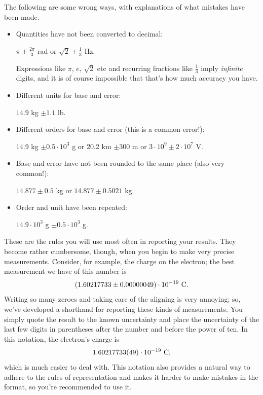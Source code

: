 The following are some wrong ways, with explanations of what mistakes have been made.
\begin{itemize}

\item Quantities have not been converted to decimal:
\begin{center}
$\pi \pm \frac{2\pi}{3}$ rad or $\sqrt{2} \pm \frac{1}{3}$ Hz.
\end{center}
Expressions like $\pi$, $e$, $\sqrt{2}$ etc and recurring fractions like $\frac{1}{3}$ imply {\it infinite} digits, and it is of course impossible that that's how much accuracy you have.

\item Different units for base and error:
\begin{center}
$14.9$ kg $\pm 1.1$ lb.
\end{center}

\item Different orders for base and error (this is a common error!):
\begin{center}
$14.9$ kg $\pm 0.5 \cdot 10^3$ g or $20.2$ km $\pm 300$ m or $3 \cdot 10^9 \pm 2 \cdot 10^7$ V.
\end{center}


\item Base and error have not been rounded to the same place (also very common!):
\begin{center}
$14.877 \pm 0.5$ kg or $14.877 \pm 0.5021$ kg.
\end{center}

\item Order and unit have been repeated:
\begin{center}
$14.9 \cdot 10^3$ g $\pm 0.5 \cdot 10^3$ g.
\end{center}


\end{itemize}

These are the rules you will use most often in reporting your results. They 
become rather cumbersome, though, when you begin to make very precise 
measurements. Consider, for example, the charge on the electron; the best 
measurement we have of this number is
\begin{eqnarray*}
(1.60217733 \pm 0.00000049) \cdot 10^{-19}~{\rm C}.
\end{eqnarray*}
Writing so many zeroes and taking care of the aligning is very annoying; so, we've developed a shorthand for reporting these 
kinds of measurements. You simply quote the result to the known uncertainty and
place the uncertainty of the last few digits in parentheses after the number 
and before the power of ten. In this notation, the electron's charge is
\begin{eqnarray*}
1.60217733(49) \cdot 10^{-19}~{\rm C},
\end{eqnarray*}
which is much easier to deal with. This notation also provides a natural way to adhere to the rules of representation and makes it harder to make mistakes in the format, so you're recommended to use it.

